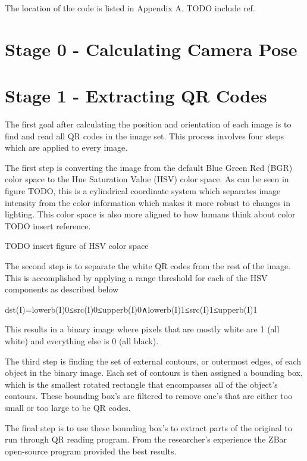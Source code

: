 The location of the code is listed in Appendix A.  TODO include ref.

\section{Stage 0 - Calculating Camera Pose}
\label{processing-stage0}


\section{Stage 1 - Extracting QR Codes}
\label{processing-stage1}

The first goal after calculating the position and orientation of each image is to find and read all QR codes in the image set.  This process involves four steps which are applied to every image.

The first step is converting the image from the default Blue Green Red (BGR) color space to the Hue Saturation Value (HSV) color space.  As can be seen in figure TODO, this is a cylindrical coordinate system which separates image intensity from the color information which makes it more robust to changes in lighting. This color space is also more aligned to how humans think about color TODO insert reference.

TODO insert figure of HSV color space

The second step is to separate the white QR codes from the rest of the image.  This is accomplished by applying a range threshold for each of the HSV components as described below

dst(I)=lowerb(I)0≤src(I)0≤upperb(I)0∧lowerb(I)1≤src(I)1≤upperb(I)1 

This results in a binary image where pixels that are mostly white are 1 (all white) and everything else is 0 (all black).

The third step is finding the set of external contours, or outermost edges, of each object in the binary image.  Each set of contours is then assigned a bounding box, which is the smallest rotated rectangle that encompasses all of the object's contours.  These bounding box's are filtered to remove one's that are either too small or too large to be QR codes. 

The final step is to use these bounding box's to extract parts of the original to run through QR reading program.  From the researcher's experience the ZBar open-source program provided the best results.  

